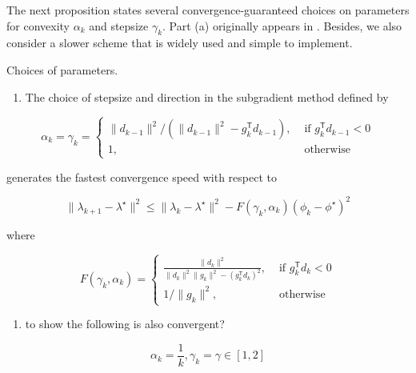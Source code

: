 The next proposition states several convergence-guaranteed choices on
parameters for convexity \(\alpha_k\) and stepsize \(\gamma_k\). Part
(a) originally appears in \cite{brannlund1995generalized}. Besides, we
also consider a slower scheme that is widely used and simple to
implement.

\begin{theorem} Choices of parameters.

  \begin{enumerate}
    \def\labelenumi{(\alph{enumi})}
    \tightlist
    \item
          The choice of stepsize and direction in the subgradient method defined
          by
  \end{enumerate}

  \[\alpha_{k}=\gamma_{k}=\begin{cases}\|d_{k-1}\|^2 /(\|d_{k-1}\|^2- g_{k}^\mathsf{T} d_{k-1}), & \text { if } g_{k}^\mathsf{T} d_{k-1} <0 \\ 1, & \text { otherwise }\end{cases}\]

  generates the fastest convergence speed with respect to

  \[\|\lambda_{k+1}-\lambda^\star\|^{2} \leqslant\|\lambda_{k}-\lambda^\star\|^{2}-F(\gamma_{k}, \alpha_{k})(\phi_k-\phi^\star)^{2}\]

  where

  \[F(\gamma_{k}, \alpha_{k})=\begin{cases}
      \frac{\|d_k\|^2}{\|d_k\|^2 \|g_k\|^2-(g_k^\mathsf{T} d_k)^{2}}, & \textrm { if } g_k^\mathsf{T} d_k <0 \\
      1/\|g_k\|^2,                                                    & \text { otherwise }\end{cases}\]

  \begin{enumerate}
    \def\labelenumi{(\alph{enumi})}
    \setcounter{enumi}{1}
    \tightlist
    \item
          to show the following is also convergent?
  \end{enumerate}

  \[\alpha_k = \frac{1}{k}, \gamma_k = \gamma \in [1, 2]\]


\end{theorem}

